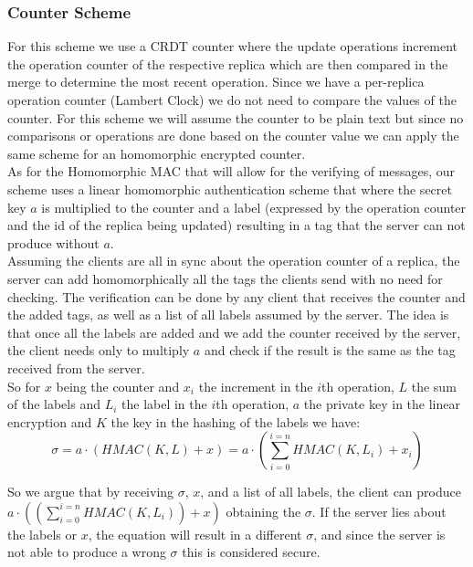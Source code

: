 \documentclass{article}
\begin{document}
\newpage
\subsubsection{Counter Scheme}
For this scheme we use a CRDT counter where the update operations increment the operation counter of the respective replica which are then compared in the merge to determine the most recent operation. Since we have a per-replica operation counter (Lambert Clock) we do not need to compare the values of the counter. For this scheme we will assume the counter to be plain text but since no comparisons or operations are done based on the counter value we can apply the same scheme for an homomorphic encrypted counter.\\

As for the Homomorphic MAC that will allow for the verifying of messages, our scheme uses a linear homomorphic authentication scheme that where the secret key $a$ is multiplied to the counter and a label (expressed by the operation counter and the id of the replica being updated) resulting in a tag that the server can not produce without $a$.\\

Assuming the clients are all in sync about the operation counter of a replica, the server can add homomorphically all the tags the clients send with no need for checking. The verification can be done by any client that receives the counter and the added tags, as well as a list of all labels assumed by the server. The idea is that once all the labels are added and we add the counter received by the server, the client needs only to multiply $a$ and check if the result is the same as the tag received from the server.\\

So for $x$ being the counter and $x_i$ the increment in the $i$th operation, $L$ the sum of the labels and $L_i$ the label in the $i$th operation, $a$ the private key in the linear encryption and $K$ the key in the hashing of the labels we have:
\begin{equation}
   \sigma = a\cdot (HMAC(K,L)+x) = a \cdot (\sum_{i=0}^{i=n}HMAC(K,L_i) + x_i )
\end{equation}

So we argue that by receiving $\sigma$, $x$, and a list of all labels, the client can produce $a \cdot ((\sum_{i=0}^{i=n}HMAC(K,L_i)) + x)$ obtaining the $\sigma$. If the server lies about the labels or $x$, the equation will result in a different $\sigma$, and since the server is not able to produce a wrong $\sigma$ this is considered secure.\\
\end{document}
